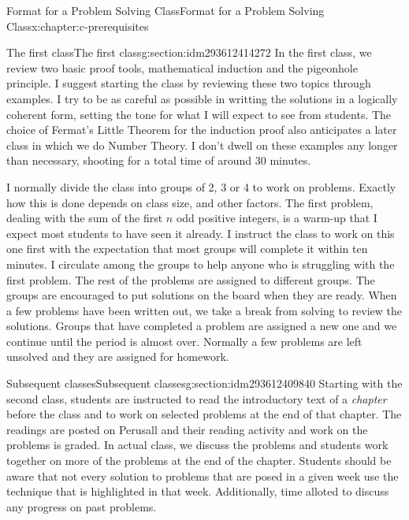 \documentclass[twoside,10pt,]{book}
\numberwithin{equation}{section}
\begin{document}
\begin{chapterptx}{Format for a Problem Solving Class}{}{Format for a Problem Solving Class}{}{}{x:chapter:c-prerequisites}
%
\begin{sectionptx}{The first class}{}{The first class}{}{}{g:section:idm293612414272}
In the first class, we review two basic proof tools, mathematical induction and the pigeonhole principle. I suggest starting the class by reviewing these two topics through examples.  I try to be as careful as possible in writting the solutions in a logically coherent form, setting the tone for what I will expect to see from students.   The choice of Fermat's Little Theorem for the induction proof also anticipates a later class in which we do Number Theory.  I don't dwell on these examples any longer than necessary, shooting for a total time of around 30 minutes.%
\par
I normally divide the class into groups of 2, 3 or 4 to work on problems.  Exactly how this is done depends on class size, and other factors.   The first problem, dealing with the sum of the first \(n\) odd positive integers, is a warm-up that I expect most students to have seen it already.  I instruct the class to work on this one first with the expectation that most groups will complete it within ten minutes.   I circulate among the groups to help anyone who is struggling with the first problem.   The rest of the problems are assigned to different groups.  The groups are encouraged to put solutions on the board when they are ready.  When a few problems have been written out, we take a break from solving to review the solutions. Groups that have completed a problem are assigned a new one and we continue until the period is almost over.  Normally a few problems are left unsolved and they are assigned for homework.%
\end{sectionptx}
%
%
\typeout{************************************************}
\typeout{************************************************}
%
\begin{sectionptx}{Subsequent classes}{}{Subsequent classes}{}{}{g:section:idm293612409840}
Starting with the second class, students are instructed to read the introductory text of a \emph{chapter} before the class and to work on selected problems at the end of that chapter.  The readings are posted on Perusall and their reading activity and work on the problems is graded.   In actual class, we discuss the problems and students work together on more of the problems at the end of the chapter.  Students should be aware that not every solution to problems that are posed in a given week use the technique that is highlighted in that week. Additionally, time alloted to discuss any progress on past problems.%

\end{sectionptx}
\end{chapterptx}
\end{document}
